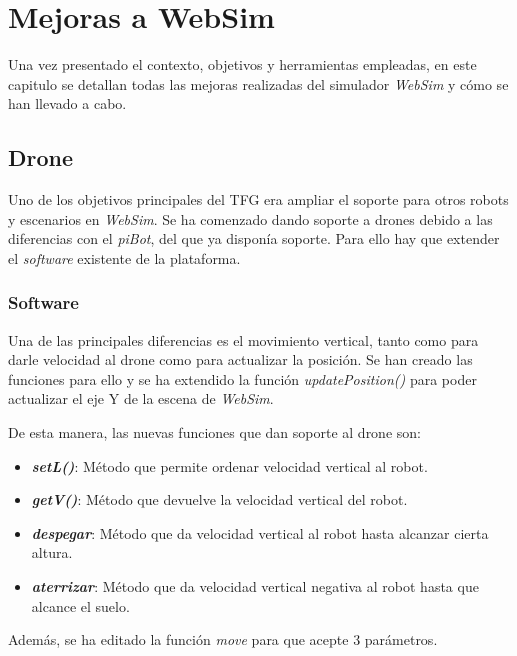 \chapter{Mejoras a WebSim}
\label{chap:mejoras}
Una vez presentado el contexto, objetivos y herramientas empleadas, en este capitulo se detallan todas las mejoras realizadas del simulador \textit{WebSim} y cómo se han llevado a cabo. 

\section{Drone}
Uno de los objetivos principales del TFG era ampliar el soporte para otros robots y escenarios en \textit{WebSim}. Se ha comenzado dando soporte a drones debido a las diferencias con el \textit{piBot}, del que ya disponía soporte. 
Para ello hay que extender el \textit{software} existente de la plataforma.
\subsection{Software}
Una de las principales diferencias es el movimiento vertical, tanto como para darle velocidad al drone como para actualizar la posición. 
Se han creado las funciones para ello y se ha extendido la función \textit{updatePosition()} para poder actualizar el eje Y de la escena de \textit{WebSim}.

De esta manera, las nuevas funciones que dan soporte al drone son: 
\begin{itemize}
    \item \textit{\textbf{setL()}}: Método que permite ordenar velocidad vertical al robot. 
    \item \textit{\textbf{getV()}}: Método que devuelve la velocidad vertical del robot.
    \item \textit{\textit{\textbf{despegar}}}: Método que da velocidad vertical al robot hasta alcanzar cierta altura.
    \item \textit{\textbf{aterrizar}}: Método que da velocidad vertical negativa al robot hasta que alcance el suelo. 
\end{itemize}

Además, se ha editado la función \textit{move} para que acepte 3 parámetros. 

